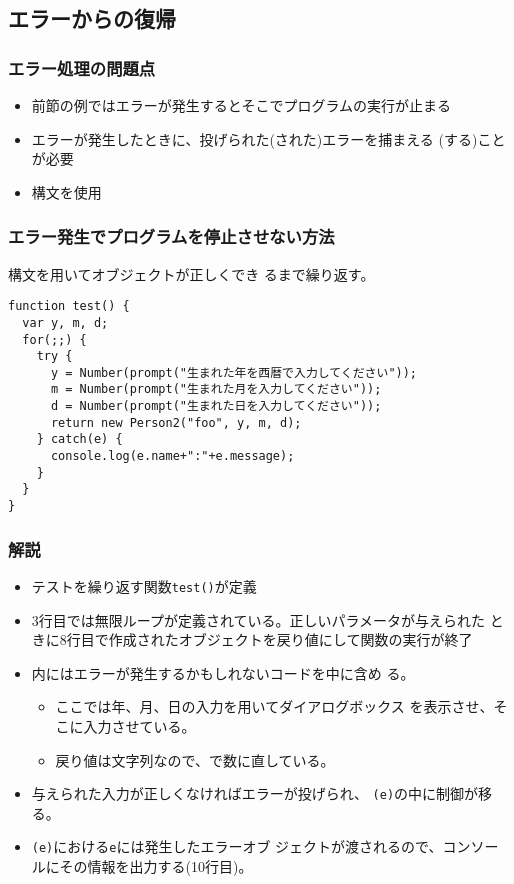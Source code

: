 \documentclass[dvipsk]{beamer}
\begin{document}
\subsection{エラーからの復帰}
\begin{frame}[containsverbatim]
 \frametitle{エラー処理の問題点}
\begin{itemize}
 \item 前節の例ではエラーが発生するとそこでプログラムの実行が止まる
 \item エラーが発生したときに、投げられた(された)エラーを捕まえる
(する)ことが必要
 \item {}構文を使用
\end{itemize}
\end{frame}
\begin{frame}[containsverbatim]
 \frametitle{エラー発生でプログラムを停止させない方法}
構文を用いてオブジェクトが正しくでき
 るまで繰り返す。
\begin{verbatim}
function test() {
  var y, m, d;
  for(;;) {
    try {
      y = Number(prompt("生まれた年を西暦で入力してください"));
      m = Number(prompt("生まれた月を入力してください"));
      d = Number(prompt("生まれた日を入力してください"));
      return new Person2("foo", y, m, d);
    } catch(e) {
      console.log(e.name+":"+e.message);
    }
  }
}
\end{verbatim}
\end{frame}
\begin{frame}[containsverbatim]
 \frametitle{解説}
\begin{itemize}
 \item テストを繰り返す関数\texttt{test()}が定義
 \item 3行目では無限ループが定義されている。正しいパラメータが与えられた
			 ときに8行目で作成されたオブジェクトを戻り値にして関数の実行が終了
 \item {}内にはエラーが発生するかもしれないコードを中に含め
			 る。
	\begin{itemize}
	 \item ここでは年、月、日の入力を用いてダイアログボックス
				 を表示させ、そこに入力させている。
	 \item 戻り値は文字列なので、で数に直している。
	\end{itemize}
 \item 与えられた入力が正しくなければエラーが投げられ、
			 \texttt{(e)}の中に制御が移る。
 \item {}\texttt{(e)}における\texttt{e}には発生したエラーオブ
			 ジェクトが渡されるので、コンソールにその情報を出力する(10行目)。
\end{itemize}
\end{frame}
\end{document}
